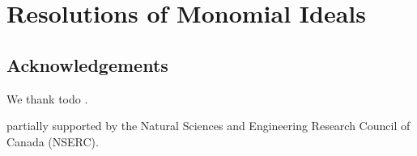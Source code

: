 \documentclass[12pt,leqno]{amsart}
\theoremstyle{definition}
\begin{document}
\section{Resolutions of Monomial Ideals}
\label{S:Resolutions of Monomial Ideals}


\subsection*{Acknowledgements}
We thank todo .
               
partially supported by
the Natural Sciences and Engineering Research Council of Canada (NSERC).

\end{document}
